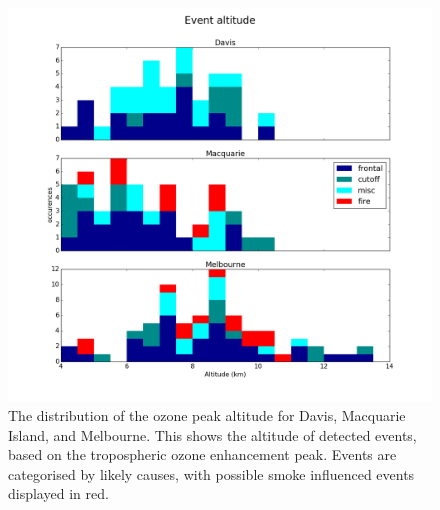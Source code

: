 \documentclass{article}
\begin{document}
  \begin{figure}[!htbp]
    \begin{center}
    \includegraphics[width=0.99\columnwidth]{figures/summary_altitude.png}
    \caption{The distribution of the ozone peak altitude for Davis, Macquarie Island, and Melbourne.
    This shows the altitude of detected events, based on the tropospheric ozone enhancement peak.
    Events are categorised by likely causes, with possible smoke influenced events displayed in red.}
    \label{fig:SummaryAltitudes}
    \end{center}
  \end{figure}
\end{document}
